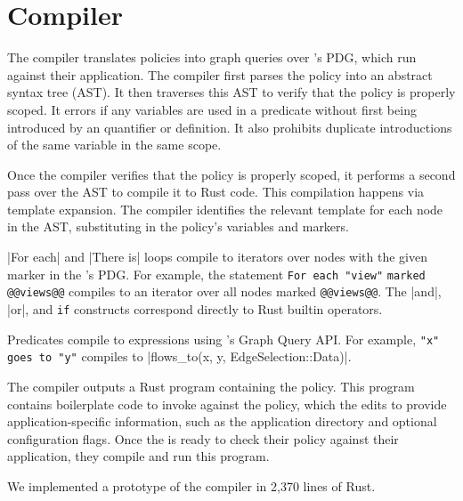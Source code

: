 \section{Compiler}

The \syslang{} compiler translates policies into graph queries over \sys{}'s PDG,
which \devs{} run against their application.
%
The compiler first parses the policy into an abstract syntax tree (AST).
%
It then traverses this AST to verify that the policy is properly scoped.
%
It errors if any variables are used in a predicate without first being introduced by an quantifier or definition.
%
It also prohibits duplicate introductions of the same variable in the same scope.

Once the compiler verifies that the policy is properly scoped,
it performs a second pass over the AST to compile it to Rust code.
%
This compilation happens via template expansion.
%
The compiler identifies the relevant template for each node in the AST,
substituting in the policy's variables and markers.

|For each| and |There is| loops compile to iterators over nodes with the given marker in the \controller{}'s PDG.
%
For example, the statement \lstinline[language=CNL]|For each "view"| \lstinline[language=CNL]|marked @@views@@| compiles to an iterator
over all nodes marked \lstinline[language=CNL]|@@views@@|.
%
The |and|, |or|, and \lstinline[language=CNL]|if| constructs correspond directly to Rust builtin operators.

Predicates compile to expressions using \sys{}'s Graph Query API.
%
For example, \lstinline[language=CNL]|"x" goes to "y"| compiles to |flows_to(x, y, EdgeSelection::Data)|.

The compiler outputs a Rust program containing the policy.
%
This program contains boilerplate code to invoke \sys{} against the policy,
which the \dev{} edits to provide application-specific information,
such as the application directory
and optional \sys{} configuration flags.
%
Once the \dev{} is ready to check their policy against their application,
they compile and run this program.

We implemented a prototype of the \syslang{} compiler in 2,370 lines of Rust.